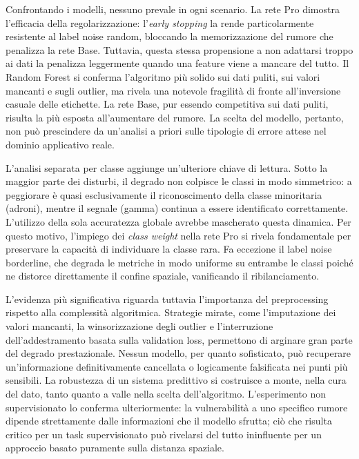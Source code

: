 \documentclass[12pt,a4paper]{article}
\begin{document}
Confrontando i modelli, nessuno prevale in ogni scenario. La rete Pro dimostra 
l'efficacia della regolarizzazione: l'\textit{early stopping} la rende 
particolarmente resistente al label noise random, bloccando la memorizzazione 
del rumore che penalizza la rete Base. Tuttavia, questa stessa propensione a 
non adattarsi troppo ai dati la penalizza leggermente quando una feature viene 
a mancare del tutto. Il Random Forest si conferma l'algoritmo più solido sui 
dati puliti, sui valori mancanti e sugli outlier, ma rivela una notevole fragilità 
di fronte all'inversione casuale delle etichette. La rete Base, pur essendo 
competitiva sui dati puliti, risulta la più esposta all'aumentare del rumore. 
La scelta del modello, pertanto, non può prescindere da un'analisi a priori 
sulle tipologie di errore attese nel dominio applicativo reale.

L'analisi separata per classe aggiunge un'ulteriore chiave di lettura. Sotto 
la maggior parte dei disturbi, il degrado non colpisce le classi in modo 
simmetrico: a peggiorare è quasi esclusivamente il riconoscimento della classe 
minoritaria (adroni), mentre il segnale (gamma) continua a essere identificato 
correttamente. L'utilizzo della sola accuratezza globale avrebbe mascherato 
questa dinamica. Per questo motivo, l'impiego dei \textit{class weight} nella 
rete Pro si rivela fondamentale per preservare la capacità di individuare la 
classe rara. Fa eccezione il label noise borderline, che degrada le metriche 
in modo uniforme su entrambe le classi poiché ne distorce direttamente il 
confine spaziale, vanificando il ribilanciamento.

L'evidenza più significativa riguarda tuttavia l'importanza del preprocessing 
rispetto alla complessità algoritmica. Strategie mirate, come l'imputazione
dei valori mancanti, la winsorizzazione degli outlier e l'interruzione 
dell'addestramento basata sulla validation loss, permettono di arginare gran 
parte del degrado prestazionale. Nessun modello, per quanto sofisticato, può 
recuperare un'informazione definitivamente cancellata o logicamente falsificata 
nei punti più sensibili. La robustezza di un sistema predittivo si costruisce 
a monte, nella cura del dato, tanto quanto a valle nella scelta dell'algoritmo. 
L'esperimento non supervisionato lo conferma ulteriormente: la vulnerabilità a 
uno specifico rumore dipende strettamente dalle informazioni che il modello 
sfrutta; ciò che risulta critico per un task supervisionato può rivelarsi 
del tutto ininfluente per un approccio basato puramente sulla distanza spaziale.
\end{document}
